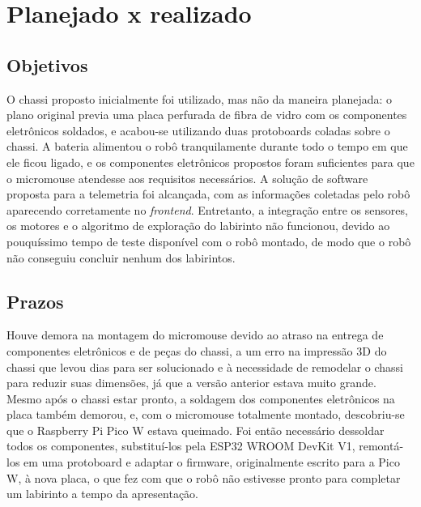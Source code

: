 \section{Planejado x realizado}
\subsection{Objetivos}

O chassi proposto inicialmente foi utilizado, mas não da maneira planejada: o plano original previa uma placa perfurada de fibra de vidro com os componentes eletrônicos soldados, e acabou-se utilizando duas protoboards coladas sobre o chassi. A bateria alimentou o robô tranquilamente durante todo o tempo em que ele ficou ligado, e os componentes eletrônicos propostos foram suficientes para que o micromouse atendesse aos requisitos necessários. A solução de software proposta para a telemetria foi alcançada, com as informações coletadas pelo robô aparecendo corretamente no \textit{frontend}. Entretanto, a integração entre os sensores, os motores e o algoritmo de exploração do labirinto não funcionou, devido ao pouquíssimo tempo de teste disponível com o robô montado, de modo que o robô não conseguiu concluir nenhum dos labirintos.

\subsection{Prazos}

Houve demora na montagem do micromouse devido ao atraso na entrega de componentes eletrônicos e de peças do chassi, a um erro na impressão 3D do chassi que levou dias para ser solucionado e à necessidade de remodelar o chassi para reduzir suas dimensões, já que a versão anterior estava muito grande. Mesmo após o chassi estar pronto, a soldagem dos componentes eletrônicos na placa também demorou, e, com o micromouse totalmente montado, descobriu-se que o Raspberry Pi Pico W estava queimado. Foi então necessário dessoldar todos os componentes, substituí-los pela ESP32 WROOM DevKit V1, remontá-los em uma protoboard e adaptar o firmware, originalmente escrito para a Pico W, à nova placa, o que fez com que o robô não estivesse pronto para completar um labirinto a tempo da apresentação.

